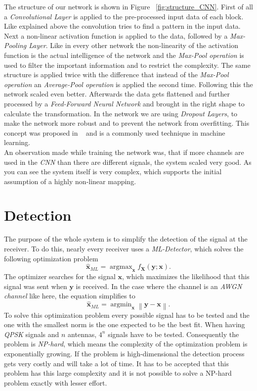 \documentclass[oneside]{msvreport}%
\DeclareMathOperator*{\argmin}{argmin}
\DeclareMathOperator*{\argmax}{argmax}
\newcommand{\norm}[1]{\left\lVert#1\right\rVert}
\newcommand{\B}[1]{\boldsymbol{#1}}
\newcommand{\Bhat}[1]{\boldsymbol{\hat{#1}}}
\newcommand{\e}[1]{\emph{#1}}
\begin{document}
\noindent The structure of our network is shown in Figure ~\ref{fig:structure_CNN}. First of all a \e{Convolutional Layer} is applied to the pre-processed input data of each block. Like explained above the convolution tries to find a pattern in the input data. Next a non-linear activation function is applied to the data, followed by a \e{Max-Pooling Layer}. Like in every other network the non-linearity of the activation function is the actual intelligence of the network and the \e{Max-Pool operation} is used to filter the important information and to restrict the complexity. The same structure is applied twice with the difference that instead of the \e{Max-Pool operation} an \e{Average-Pool operation} is applied the second time. Following this the network scaled even better. Afterwards the data gets flattened and further processed by a \e{Feed-Forward Neural Network} and brought in the right shape to calculate the transformation. In the network we are using \e{Dropout Layers}, to make the network more robust and to prevent the network from overfitting. This concept was proposed in ~\cite{hinton2012improving} and is a commonly used technique in machine learning.\\ An observation made while training the network was, that if more channels are used in the \e{CNN} than there are different signals, the system scaled very good. As you can see the system itself is very complex, which supports the initial assumption of a highly non-linear mapping.

\chapter{Detection}\label{Detection}
The purpose of the whole system is to simplify the detection of the signal at the receiver. To do this, nearly every receiver uses a \e{ML-Detector}, which solves the following optimization problem
\begin{equation}
  \Bhat{x}_{ML} = \argmax_{\B{x}} f_{\bm{X}}(\bm{y}; \bm{x}).
\end{equation}
The optimizer searches for the signal $\B{x}$, which maximizes the likelihood that this signal was sent when $\B{y}$ is received. In the case where the channel is an \e{AWGN channel} like here, the equation simplifies to
\begin{equation}
  \Bhat{x}_{ML} = \argmin_{\B{x}} \norm{\B{y} - \B{x}}.
\end{equation}
To solve this optimization problem every possible signal has to be tested and the one with the smallest norm is the one expected to be the best fit. When having \e{QPSK} signals and $n$ antennas, $4^n$ signals have to be tested. Consequently the problem is \e{NP-hard}, which means the complexity of the optimization problem is exponentially growing. If the problem is high-dimensional the detection process gets very costly and will take a lot of time. It has to be accepted that this problem has this large complexity and it is not possible to solve a NP-hard problem exactly with lesser effort.\\
\end{document}
